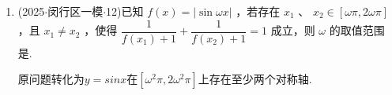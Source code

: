 \begin{enumerate}
\begin{jieda}
        假设$\omega < \dfrac{\pi}{2}$，则$sint_1, sint_2 \geq 0$，不满足要求.

        故$sint_1$可以取到$1$，故$sint_2$应可以取到$-1$，故$\omega \geq \dfrac{3}{4}$，经检验$\omega = \dfrac{3}{4}$满足要求.
    \end{jieda}

    \item (2025$\cdot$闵行区一模$\cdot$12)已知 $f\left( x\right)  = \left| {\sin {\omega x}}\right|$ ，若存在 ${x}_{1}$ 、 ${x}_{2} \in  \left\lbrack  {{\omega \pi },{2\omega \pi }}\right\rbrack$ ，且 ${x}_{1} \neq  {x}_{2}$ ，使得 $\dfrac{1}{f\left( {x}_{1}\right)  + 1} + \dfrac{1}{f\left( {x}_{2}\right)  + 1} = 1$ 成立，则 $\omega$ 的取值范围是.
    \begin{jieda}
        原问题转化为$y = sinx$在$[\omega^2\pi, 2\omega^2\pi]$上存在至少两个对称轴.
    \end{jieda}
\end{enumerate}

